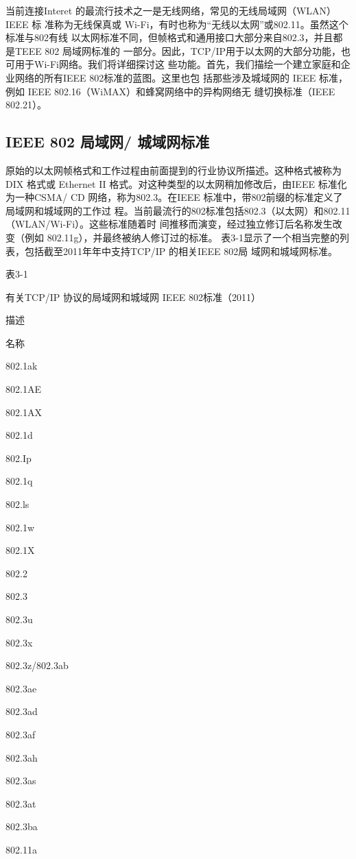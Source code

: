 当前连接Interet 的最流行技术之一是无线网络，常见的无线局域网（WLAN） IEEE 标
准称为无线保真或 Wi-Fi，有时也称为“无线以太网”或802.11。虽然这个标准与802有线
以太网标准不同，但帧格式和通用接口大部分来自802.3，并且都是TEEE 802 局域网标准的
一部分。因此，TCP/IP用于以太网的大部分功能，也可用于Wi-Fi网络。我们将详细探讨这
些功能。首先，我们描绘一个建立家庭和企业网络的所有IEEE 802标准的蓝图。这里也包
括那些涉及城域网的 IEEE 标准，例如 IEEE 802.16（WiMAX）和蜂窝网络中的异构网络无
缝切换标准（IEEE 802.21）。

\subsection{IEEE 802 局域网/ 城域网标准}

原始的以太网帧格式和工作过程由前面提到的行业协议所描述。这种格式被称为DIX
格式或 Ethernet II 格式。对这种类型的以太网稍加修改后，由IEEE 标准化为一种CSMA/
CD 网络，称为802.3。在IEEE 标准中，带802前缀的标准定义了局域网和城域网的工作过
程。当前最流行的802标准包括802.3（以太网）和802.11（WLAN/Wi-Fi）。这些标准随着时
间推移而演变，经过独立修订后名称发生改变（例如 802.11g），并最终被纳人修订过的标准。
表3-1显示了一个相当完整的列表，包括截至2011年年中支持TCP/IP 的相关IEEE 802局
域网和城域网标准。

表3-1

有关TCP/IP 协议的局域网和城域网 IEEE 802标准（2011）

描述

名称

802.1ak

802.1AE

802.1AX

802.1d

802.Ip

802.1q

802.ls

802.1w

802.1X

802.2

802.3

802.3u

802.3x

802.3z/802.3ab

802.3ae

802.3ad

802.3af

802.3ah

802.3as

802.3at

802.3ba

802.11a

